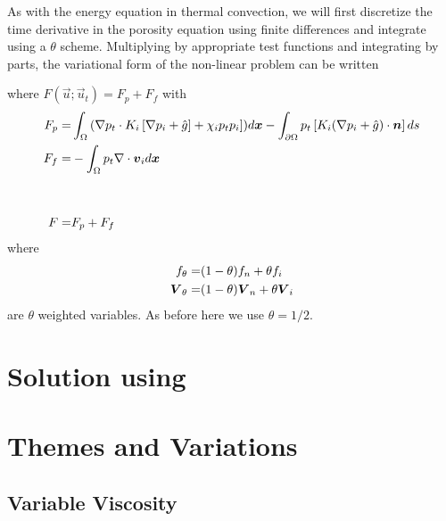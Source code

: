 As with the energy equation in thermal convection, we will first
discretize the time derivative in the porosity equation using finite
differences and integrate using a $\theta$ scheme.  
Multiplying by appropriate test functions and integrating by parts, the
variational form of the non-linear problem can be written
\begin{quote}
\end{quote}
 where $F(\vec{u};\vec{u}_{t}) = F_{p} + F_{f}$ with
\begin{align}
         F_{p} =  & \int_\Omega \left(
\nabla p_{t}\cdot K_{i}
                    \left[
                    \nabla p_{i} + \hat{g}
                    \right] 
+ \chi_{i}p_{t}p_{i}
 \right])d{\mbox{\boldmath$x$}}  - \int_{\partial\Omega} p_{t}
                    \left[
                    K_{i}(\nabla p_{i} + \hat{g})\cdot{\mbox{\boldmath$n$}}
                    \right] ds\\
 F_{f} =& -\int_\Omega p_t\nabla\cdot{\mbox{\boldmath$v$}}_{i} d{\mbox{\boldmath$x$}}\\
\label{eq:5.5}\\
\nonumber \\
  F = & F_{p} + F_{f} \label{eq:5.systemresidual}
\end{align}
where 
\begin{align*}
  f_{\theta} = & (1-\theta)f_{n} + \theta f_{i}\\
  {\mbox{\boldmath$V$}}_{\theta} = & (1-\theta){\mbox{\boldmath$V$}}_{n} + \theta {\mbox{\boldmath$V$}}_{i}
\end{align*}
are $\theta$ weighted variables.  As before here we use $\theta=1/2$.

\section{Solution using \TF}
\label{sec:solution-using-tf}



\section{Themes and Variations}
\label{sec:themes-variations}


\subsection{Variable Viscosity}
\label{sec:variable-viscosity}



